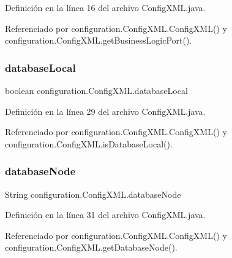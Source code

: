 Definición en la línea 16 del archivo Config\+X\+M\+L.\+java.



Referenciado por configuration.\+Config\+X\+M\+L.\+Config\+X\+M\+L() y configuration.\+Config\+X\+M\+L.\+get\+Business\+Logic\+Port().

\mbox{\label{classconfiguration_1_1_config_x_m_l_a6ca52a37fbb4b0994aeb388df59a275f}} 
\subsubsection{\texorpdfstring{databaseLocal}{databaseLocal}}
{\footnotesize\ttfamily boolean configuration.\+Config\+X\+M\+L.\+database\+Local\hspace{0.3cm}{\ttfamily [private]}}



Definición en la línea 29 del archivo Config\+X\+M\+L.\+java.



Referenciado por configuration.\+Config\+X\+M\+L.\+Config\+X\+M\+L() y configuration.\+Config\+X\+M\+L.\+is\+Database\+Local().

\mbox{\label{classconfiguration_1_1_config_x_m_l_a71b31518e099bee7f0eefa043b38d706}} 
\subsubsection{\texorpdfstring{databaseNode}{databaseNode}}
{\footnotesize\ttfamily String configuration.\+Config\+X\+M\+L.\+database\+Node\hspace{0.3cm}{\ttfamily [private]}}



Definición en la línea 31 del archivo Config\+X\+M\+L.\+java.



Referenciado por configuration.\+Config\+X\+M\+L.\+Config\+X\+M\+L() y configuration.\+Config\+X\+M\+L.\+get\+Database\+Node().

\mbox{\label{classconfiguration_1_1_config_x_m_l_afaa301de70783638240f5a9a147f615f}} 
